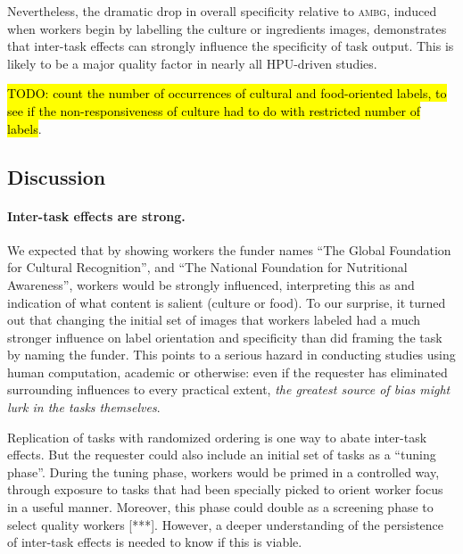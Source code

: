 \documentclass[a4paper]{report}
\newcommand{\td}[1]{{\color{blu}\hl{TODO: #1}}}
\begin{document}
Nevertheless, the dramatic drop in overall specificity relative to 
\textsc{ambg}, induced when workers begin by labelling the culture or 
ingredients images, demonstrates that 
inter-task effects can strongly influence the specificity of task output.
This is likely to be a major quality factor in nearly all HPU-driven studies.

\td{count the number of occurrences of cultural and food-oriented labels, 
	to see if the non-responsiveness of culture had to do with restricted
number of labels}.


\subsection*{Discussion}

\paragraph{Inter-task effects are strong.}  We expected that by showing
workers the funder names ``The Global Foundation for Cultural Recognition'',
and ``The National Foundation for Nutritional Awareness'', workers would 
be strongly influenced, interpreting this as and indication of what content 
is salient (culture or food).
To our surprise, it turned out that changing the initial set of images that
workers labeled had a much stronger influence on label orientation and 
specificity than did framing the task by naming the funder.
This points to a serious hazard in conducting studies using human computation,
academic or otherwise: even if the requester has 
eliminated surrounding influences to every practical extent, 
\textit{the greatest source of bias might lurk in the tasks themselves}.

Replication of tasks with randomized ordering is one way to abate inter-task
effects.  But the requester could also include an initial set of tasks as a 
``tuning phase''.  During the tuning phase, workers would be primed in a 
controlled way, through exposure to tasks that had been specially picked to
orient worker focus in a useful manner.  Moreover, this phase could double as a
screening phase to select quality workers [***].  However, a deeper 
understanding of the persistence of inter-task effects is needed to know if 
this is viable. 
\end{document}
